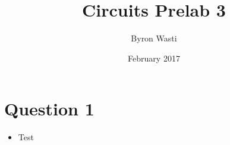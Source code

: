 \documentclass{article}
\title{Circuits Prelab 3}
\author{Byron Wasti}
\date{February 2017}
\begin{document}
\maketitle

\section{Question 1}
\begin{itemize}
    \item Test

\end{itemize}
\end{document}
